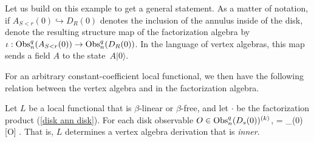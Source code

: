 Let us build on this example to get a general statement.
As a matter of notation, if $A_{S<r}(0) \hookrightarrow D_R(0)$ denotes the inclusion of the annulus inside of the disk, 
denote the resulting structure map of the factorization algebra by $\iota : {\rm Obs}^q_n(A_{S<r}(0)) \to {\rm Obs}^q_n(D_R(0))$. 
In the language of vertex algebras, this map sends a field $A$ to the state~$A |0\rangle$.

For an arbitrary constant-coefficient local functional, 
we then have the following relation between the vertex algebra and in the factorization algebra.

\begin{lemma}\label{zero fourier mode} 
Let $L$ be a local functional that is $\beta$-linear or $\beta$-free, 
and let $\cdot$ be the factorization product (\ref{disk ann disk}). 
For each disk observable $O \in {\rm Obs}^q_n(D_s(0))^{(k)}$, 
 = _{(0)} [O] .
\een
That is, $L$ determines a vertex algebra derivation that is {\em inner}.
\end{lemma}

